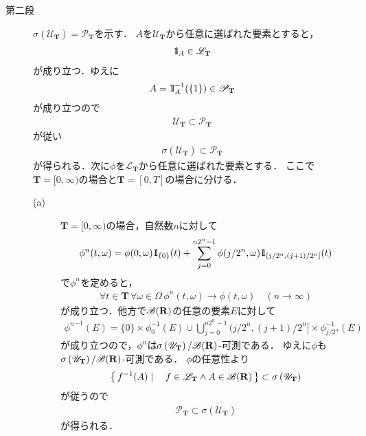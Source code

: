 \begin{sketch}
\begin{description}
			\item[第二段]
				$\sigma\left(\mathscr{U}_{\mathbf{T}}\right) = \mathscr{P}_{\mathbf{T}}$を示す．
				$A$を$\mathscr{U}_{\mathbf{T}}$から任意に選ばれた要素とすると，
				\begin{align}
					\mbox{1}\hspace{-0.25em}\mbox{l}_A \in \mathscr{L}_{\mathbf{T}}
				\end{align}
				が成り立つ．ゆえに
				\begin{align}
					A = \mbox{1}\hspace{-0.25em}\mbox{l}_A^{-1}(\{1\}) \in \mathscr{P}_{\mathbf{T}}
				\end{align}
				が成り立つので
				\begin{align}
					\mathscr{U}_{\mathbf{T}} \subset \mathscr{P}_{\mathbf{T}}
				\end{align}
				が従い
				\begin{align}
					\sigma\left(\mathscr{U}_{\mathbf{T}}\right) \subset \mathscr{P}_{\mathbf{T}}
				\end{align}
				が得られる．次に$\phi$を$\mathscr{L}_{\mathbf{T}}$から任意に選ばれた要素とする．
				ここで$\mathbf{T} = [0,\infty)$の場合と$\mathbf{T} = [0,T]$の場合に分ける．
				\begin{description}
					\item[(a)] $\mathbf{T} = [0,\infty)$の場合，自然数$n$に対して
						\begin{align}
							\phi^n(t,\omega)
							= \phi(0,\omega)\mbox{1}\hspace{-0.25em}\mbox{l}_{\{0\}}(t) + 
							\sum_{j=0}^{n2^n-1}\phi(j/2^n,\omega) \mbox{1}\hspace{-0.25em}\mbox{l}_{(j/2^n,(j+1)/2^n]}(t)
						\end{align}
						で$\phi^n$を定めると，
						\begin{align}
							\forall t \in \mathbf{T}\, \forall \omega \in \Omega\,
							\phi^n(t,\omega) \longrightarrow \phi(t,\omega)
							\quad (n \longrightarrow \infty)
						\end{align}
						が成り立つ．他方で$\mathscr{B}(\mathbf{R})$の任意の要素$E$に対して
						\begin{align}
							{\phi^n}^{-1}(E)
							= \{0\} \times \phi_0^{-1}(E) \cup 
							\bigcup_{j=0}^{n2^n-1} (j/2^n,(j+1)/2^n] \times \phi_{j/2^n}^{-1}(E)
						\end{align}
						が成り立つので，$\phi^n$は$\sigma\left(\mathscr{U}_{\mathbf{T}}\right)/\mathscr{B}(\mathbf{R})$-可測である．
						ゆえに$\phi$も$\sigma\left(\mathscr{U}_{\mathbf{T}}\right)/\mathscr{B}(\mathbf{R})$-可測である．
						$\phi$の任意性より
						\begin{align}
							\left\{\, f^{-1}(A) \mid \quad f \in \mathscr{L}_{\mathbf{T}} \wedge A \in \mathscr{B}(\mathbf{R})\, \right\}
							\subset \sigma\left(\mathscr{U}_{\mathbf{T}}\right)
						\end{align}
						が従うので
						\begin{align}
							\mathscr{P}_{\mathbf{T}} \subset \sigma\left(\mathscr{U}_{\mathbf{T}}\right)
						\end{align}
						が得られる．
						

\end{description}
\end{description}
\end{sketch}
